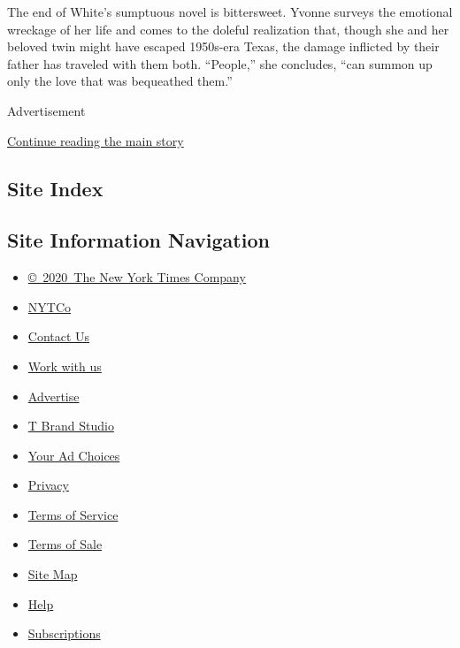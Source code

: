 The end of White's sumptuous novel is bittersweet. Yvonne surveys the
emotional wreckage of her life and comes to the doleful realization
that, though she and her beloved twin might have escaped 1950s-era
Texas, the damage inflicted by their father has traveled with them both.
``People,'' she concludes, ``can summon up only the love that was
bequeathed them.''

Advertisement

\protect\hyperlink{after-bottom}{Continue reading the main story}

\hypertarget{site-index}{%
\subsection{Site Index}\label{site-index}}

\hypertarget{site-information-navigation}{%
\subsection{Site Information
Navigation}\label{site-information-navigation}}

\begin{itemize}
\tightlist
\item
  \href{https://help.nytimes3xbfgragh.onion/hc/en-us/articles/115014792127-Copyright-notice}{©~2020~The
  New York Times Company}
\end{itemize}

\begin{itemize}
\tightlist
\item
  \href{https://www.nytco.com/}{NYTCo}
\item
  \href{https://help.nytimes3xbfgragh.onion/hc/en-us/articles/115015385887-Contact-Us}{Contact
  Us}
\item
  \href{https://www.nytco.com/careers/}{Work with us}
\item
  \href{https://nytmediakit.com/}{Advertise}
\item
  \href{http://www.tbrandstudio.com/}{T Brand Studio}
\item
  \href{https://www.nytimes3xbfgragh.onion/privacy/cookie-policy\#how-do-i-manage-trackers}{Your
  Ad Choices}
\item
  \href{https://www.nytimes3xbfgragh.onion/privacy}{Privacy}
\item
  \href{https://help.nytimes3xbfgragh.onion/hc/en-us/articles/115014893428-Terms-of-service}{Terms
  of Service}
\item
  \href{https://help.nytimes3xbfgragh.onion/hc/en-us/articles/115014893968-Terms-of-sale}{Terms
  of Sale}
\item
  \href{https://spiderbites.nytimes3xbfgragh.onion}{Site Map}
\item
  \href{https://help.nytimes3xbfgragh.onion/hc/en-us}{Help}
\item
  \href{https://www.nytimes3xbfgragh.onion/subscription?campaignId=37WXW}{Subscriptions}
\end{itemize}
